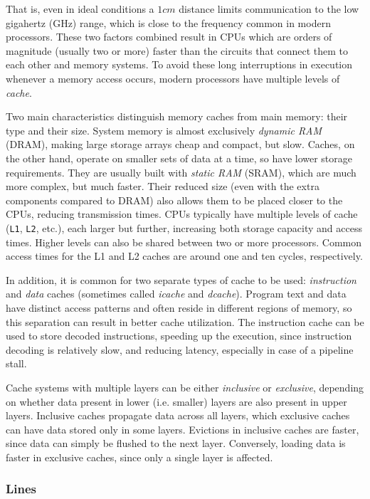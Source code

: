 That is, even in ideal conditions a $1cm$ distance limits communication to the
low gigahertz (GHz) range, which is close to the frequency common in modern
processors.  These two factors combined result in CPUs which are orders of
magnitude (usually two or more) faster than the circuits that connect them to
each other and memory systems.  To avoid these long interruptions in execution
whenever a memory access occurs, modern processors have multiple levels of
\textit{cache}.

Two main characteristics distinguish memory caches from main memory: their type
and their size.  System memory is almost exclusively \textit{dynamic RAM}
(DRAM), making large storage arrays cheap and compact, but slow.  Caches, on the
other hand, operate on smaller sets of data at a time, so have lower storage
requirements.  They are usually built with \textit{static RAM} (SRAM), which are
much more complex, but much faster.  Their reduced size (even with the extra
components compared to DRAM) also allows them to be placed closer to the CPUs,
reducing transmission times.  CPUs typically have multiple levels of cache
(\texttt{L1}, \texttt{L2}, etc.), each larger but further, increasing both
storage capacity and access times.  Higher levels can also be shared between two
or more processors.  Common access times for the L1 and L2 caches are around one
and ten cycles, respectively.

In addition, it is common for two separate types of cache to be used:
\textit{instruction} and \textit{data} caches (sometimes called \textit{icache}
and \textit{dcache}).  Program text and data have distinct access patterns and
often reside in different regions of memory, so this separation can result in
better cache utilization.  The instruction cache can be used to store decoded
instructions, speeding up the execution, since instruction decoding is
relatively slow, and reducing latency, especially in case of a pipeline stall.

Cache systems with multiple layers can be either \textit{inclusive} or
\textit{exclusive}, depending on whether data present in lower (i.e. smaller)
layers are also present in upper layers.  Inclusive caches propagate data across
all layers, which exclusive caches can have data stored only in some layers.
Evictions in inclusive caches are faster, since data can simply be flushed to
the next layer.  Conversely, loading data is faster in exclusive caches, since
only a single layer is affected.

\subsubsection{Lines}

